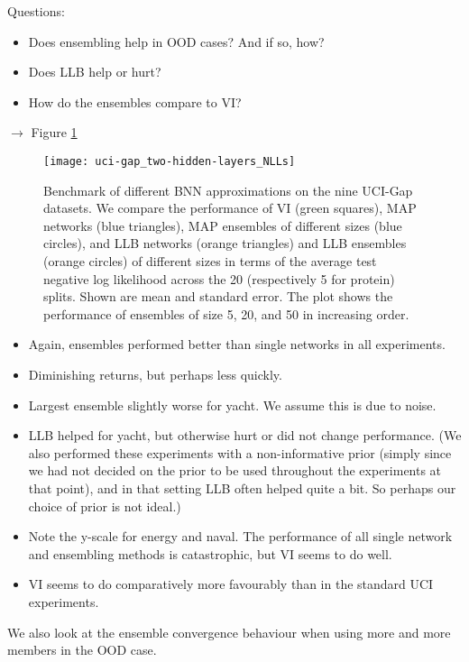 \documentclass[../thesis.tex]{subfiles}
\begin{document}
Questions:
\begin{itemize}
    \item Does ensembling help in OOD cases? And if so, how?
    \item Does LLB help or hurt?
    \item How do the ensembles compare to VI?
\end{itemize}
\bigskip

$\rightarrow$ Figure \ref{fig:uci-gap-benchmark}

\begin{figure}
    \centering
    \texttt{[image: uci-gap\_two-hidden-layers\_NLLs]} 
    \caption{Benchmark of different BNN approximations on the nine UCI-Gap datasets. We compare the performance of VI (green squares), MAP networks (blue triangles), MAP ensembles of different sizes (blue circles), and LLB networks (orange triangles) and LLB ensembles (orange circles) of different sizes in terms of the average test negative log likelihood across the 20 (respectively 5 for protein) splits. Shown are mean and standard error. The plot shows the performance of ensembles of size 5, 20, and 50 in increasing order.}
    \label{fig:uci-gap-benchmark}
\end{figure}

\bigskip

\begin{itemize}
    \item Again, ensembles performed better than single networks in all experiments. 
    \item Diminishing returns, but perhaps less quickly.
    \item Largest ensemble slightly worse for yacht. We assume this is due to noise.
    \item LLB helped for yacht, but otherwise hurt or did not change performance. (We also performed these experiments with a non-informative prior (simply since we had not decided on the prior to be used throughout the experiments at that point), and in that setting LLB often helped quite a bit. So perhaps our choice of prior is not ideal.)
    \item Note the y-scale for energy and naval. The performance of all single network and ensembling methods is catastrophic, but VI seems to do well.
    \item VI seems to do comparatively more favourably than in the standard UCI experiments.
\end{itemize}

\bigskip
We also look at the ensemble convergence behaviour when using more and more members in the OOD case.
\bigskip
\end{document}
